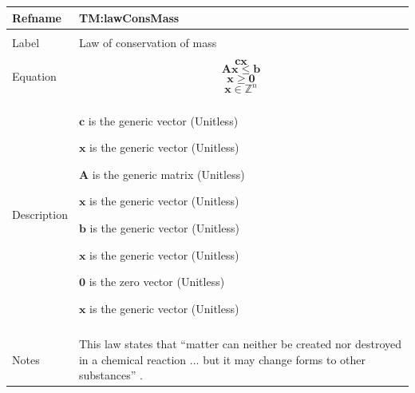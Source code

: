 \documentclass[12pt]{article}
\begin{document}
\begin{minipage}{\textwidth}
\begin{tabular}{>{\raggedright}p{}>{\raggedright\arraybackslash}p{}}
\toprule \textbf{Refname} & \textbf{TM:lawConsMass}
\label{TM:lawConsMass}
\\ \midrule \\
Label & Law of conservation of mass
        
\\ \midrule \\
Equation & \begin{displaymath}
           \symbf{c} \symbf{x}
           \end{displaymath}
           \begin{displaymath}
           \symbf{A} \symbf{x}\leq{}\symbf{b}
           \end{displaymath}
           \begin{displaymath}
           \symbf{x}\geq{}\symbf{0}
           \end{displaymath}
           \begin{displaymath}
           \symbf{x}\in{}\mathbb{Z}^{n}
           \end{displaymath}
\\ \midrule \\
Description & \begin{symbDescription}
              \item{$\symbf{c}$ is the generic vector (Unitless)}
              \item{$\symbf{x}$ is the generic vector (Unitless)}
              \end{symbDescription}
              \begin{symbDescription}
              \item{$\symbf{A}$ is the generic matrix (Unitless)}
              \item{$\symbf{x}$ is the generic vector (Unitless)}
              \item{$\symbf{b}$ is the generic vector (Unitless)}
              \end{symbDescription}
              \begin{symbDescription}
              \item{$\symbf{x}$ is the generic vector (Unitless)}
              \item{$\symbf{0}$ is the zero vector (Unitless)}
              \end{symbDescription}
              \begin{symbDescription}
              \item{$\symbf{x}$ is the generic vector (Unitless)}
              \end{symbDescription}
\\ \midrule \\
Notes & This law states that ``matter can neither be created nor destroyed in a chemical reaction ... but it may change forms to other substances'' \cite[(pg. 112)]{lund2023}.
        

\end{tabular}
\end{minipage}
\end{document}
